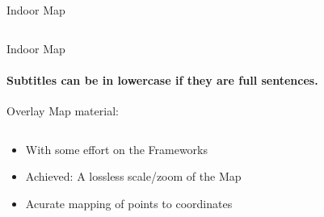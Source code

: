 \documentclass[11pt]{beamer}
\begin{document}
\begin{frame}{Indoor Map}
\begin{columns}[T]
\begin{column}{.4\textwidth}
  \end{column}
\end{columns}

\end{frame}


\begin{frame}{Indoor Map}

\framesubtitle{Subtitles can be in lowercase if they are full sentences.}
Overlay Map material:

  \begin{columns}[T]
  \begin{column}{.6\textwidth}
  \begin{itemize}
    \item With some effort on the Frameworks
    \item Achieved: A lossless scale/zoom of the Map
    \item Acurate mapping of points to coordinates
  \end{itemize}
  \end{column}
  \begin{column}{.4\textwidth}

\end{column}
\end{columns}
\end{frame}
\end{document}
